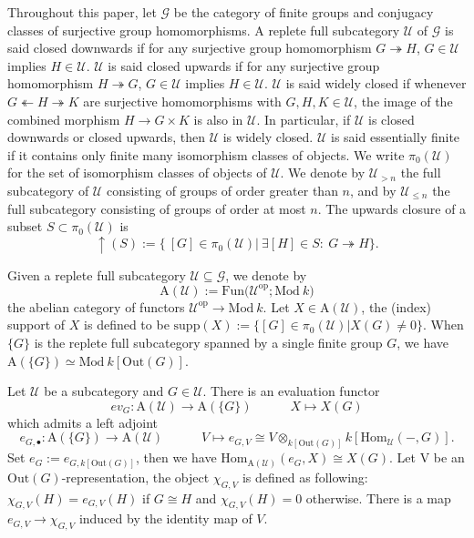 \documentclass[11pt,a4paper]{amsart}
\numberwithin{equation}{section} \theoremstyle{plain}
\begin{document}
Throughout this paper,  let $\mathcal{G}$ be the category of finite groups and conjugacy classes of surjective group homomorphisms. A replete full subcategory $\mathcal{U}$ of $\mathcal{G}$ is said closed downwards if for any surjective group homomorphism $G\twoheadrightarrow H$, $G\in \mathcal{U}$ implies $H\in \mathcal{U}$. $\mathcal{U}$  is said closed upwards if for any surjective group homomorphism $H\twoheadrightarrow G$, $G\in \mathcal{U}$ implies $H\in \mathcal{U}$. $\mathcal{U}$  is said widely closed  if whenever $G\twoheadleftarrow H\twoheadrightarrow K$ are surjective homomorphisms with $G,H,K\in \mathcal{U}$, the image of the combined morphism $H\rightarrow G\times K$ is also in $\mathcal{U}$. In particular, if $\mathcal{U}$ is closed downwards or closed upwards, then $\mathcal{U}$ is widely closed. $\mathcal{U}$ is said essentially finite if it contains only finite many isomorphism classes of objects. We write $\pi_{0}(\mathcal{U})$ for the set of isomorphism classes of objects of $\mathcal{U}$. We denote by $\mathcal{U}_{> n}$ the full subcategory of $\mathcal{U}$ consisting of groups of order greater than
$n$, and by $\mathcal{U}_{\leq n}$ the full subcategory consisting of groups of order at most $n$.  The upwards closure of a subset $S\subset \pi_{0}(\mathcal{U})$ is $$\uparrow(S):=\{~[G]\in \pi_{0}(\mathcal{U}) |~\exists [H]\in S:~G\twoheadrightarrow H\}.$$


 Given a replete full subcategory $\mathcal{U}\subseteq \mathcal{G}$, we denote by $$\mathrm{A(\mathcal{U}):=Fun(\mathcal{U}^{op};Mod}~k)$$ the abelian category of functors $\mathrm{\mathcal{U}^{op}\rightarrow Mod}~k.$ Let $X\in \mathrm{A(\mathcal{U})}$, the (index) support of $X$ is defined to be $\mathrm{supp}(X):=\{[G]\in\pi_{0}(\mathcal{U})|X(G)\neq 0\}$. When $\{G\}$ is the replete full subcategory spanned by a single finite group $G$, we have $\mathrm{A}(\{G\})\simeq \mathrm{Mod}~k[\mathrm{Out}(G)]$.

Let $\mathcal{U}$ be a subcategory and $G\in \mathcal{U}$. There is an evaluation functor $$ev_{G}:\mathrm{A}(\mathcal{U})\rightarrow \mathrm{A}(\{G\})\quad\quad\quad X\mapsto X(G)$$ which admits a left adjoint $$e_{G,\bullet}:\mathrm{A}(\{G\})\rightarrow \mathrm{A}(\mathcal{U})\quad\quad\quad V\mapsto e_{G,V}\cong V\otimes_{k[\mathrm{Out}(G)]}k[\mathrm{Hom}_{\mathcal{U}}(-,G)].$$ Set $e_{G}:=e_{G,k[\mathrm{Out}(G)]}$, then we have $\mathrm{Hom}_{\mathrm{A}(\mathcal{U})}(e_{G},X)\cong X(G)$. Let V be an $\mathrm{Out}(G)$-representation, the object $\chi_{G,V}$ is defined as following: $\chi_{G,V}(H)=e_{G,V}(H)$ if $G\cong H$ and  $\chi_{G,V}(H)=0$ otherwise. There is a map $e_{G,V}\rightarrow \chi_{G,V}$ induced by the identity map of $V$.
\end{document}
